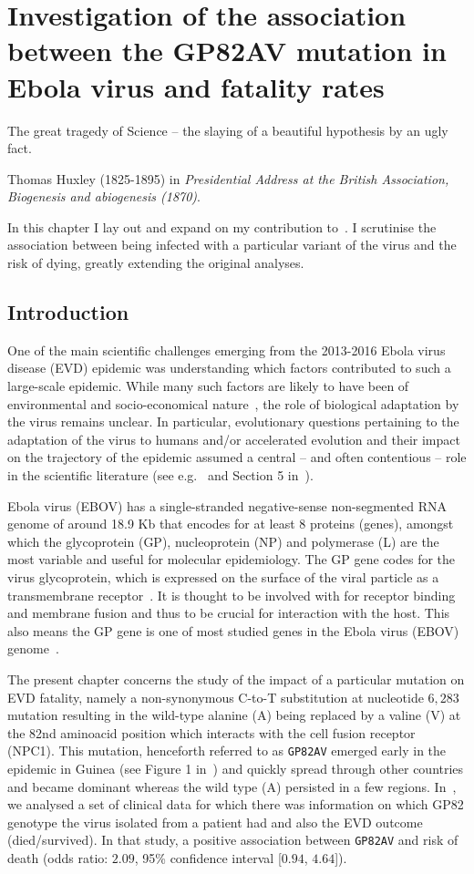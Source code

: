 \chapter{Investigation of the association between the GP82AV mutation in Ebola virus and fatality rates}
\epigraph{The great tragedy of Science -- the slaying of a beautiful hypothesis by an ugly fact.}{Thomas Huxley (1825-1895) in \textit{Presidential Address at the British Association, Biogenesis and abiogenesis (1870)}.}


In this chapter I lay out and expand on my contribution to~\cite{Diehl2016}.
I scrutinise the association between being infected with a particular variant of the virus and the risk of dying, greatly extending the original analyses.

\section{Introduction}

One of the main scientific challenges emerging from the 2013-2016 Ebola virus disease (EVD) epidemic was understanding which factors contributed to such a large-scale epidemic.
While many such factors are likely to have been of environmental and socio-economical nature~\citep{Dudas2017}, the role of biological adaptation by the virus remains unclear.
In particular, evolutionary questions pertaining to the adaptation of the virus to humans and/or accelerated evolution and their impact on the trajectory of the epidemic assumed a central -- and often contentious -- role in the scientific literature (see e.g.~\cite{Holmes2016} and Section 5 in~\cite{Bausch2017}).

Ebola virus (EBOV) has a single-stranded negative-sense non-segmented RNA genome of around 18.9 Kb that encodes for at least 8 proteins (genes), amongst which the glycoprotein (GP), nucleoprotein (NP) and polymerase (L) are the most variable and useful for molecular epidemiology.
The GP gene codes for the virus glycoprotein, which is expressed on the surface of the viral particle as a transmembrane receptor~\citep{Takada1997}.
It is thought to be involved with  for receptor binding and membrane fusion and thus to be crucial for interaction with the host.
This also means the GP gene is one of most studied genes in the Ebola virus (EBOV) genome~\citep{Li2016}.

The present chapter concerns the study of the impact of a particular mutation on EVD fatality, namely a non-synonymous C-to-T substitution at nucleotide $6,283$ mutation resulting in the wild-type alanine (A) being replaced by a valine (V) at the 82nd aminoacid position which interacts with the cell fusion receptor (NPC1).
This mutation, henceforth referred to as \verb|GP82AV| emerged early in the epidemic in Guinea (see Figure 1 in~\cite{Diehl2016}) and quickly spread through other countries and became dominant whereas the wild type (A) persisted in a few regions.
In~\cite{Diehl2016}, we analysed a set of clinical data for which there was information on which GP82 genotype the virus isolated from a patient had and also the EVD outcome (died/survived).
In that study, a positive association between  \verb|GP82AV| and risk of death (odds ratio: $2.09$, 95\% confidence interval [$0.94$, $4.64$]).

